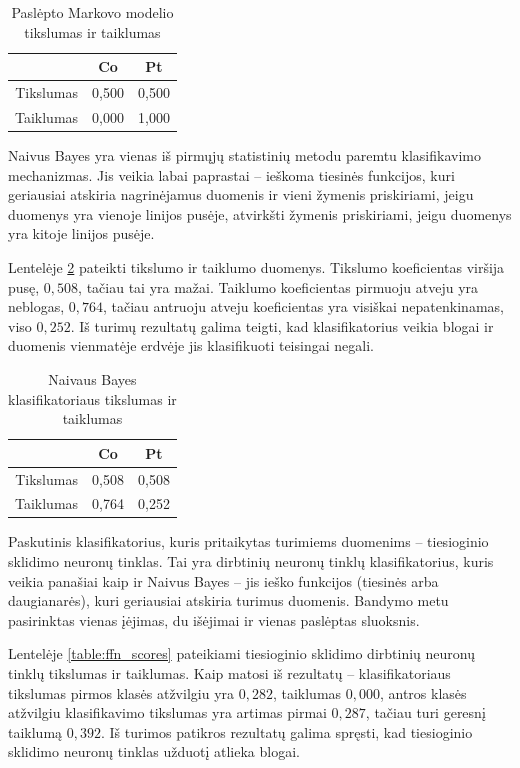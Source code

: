 \documentclass[]{vgtuef}
\begin{document}
\begin{table}
  \centering
  \renewcommand{\arraystretch}{1.3}
  \caption{Paslėpto Markovo modelio tikslumas ir taiklumas}
  \label{table:hmm_scores}
  \begin{tabular}{|c|c|c|} \hline
    & Co & Pt \\ \hline
    Tikslumas & 0,500 & 0,500 \\ \hline
    Taiklumas & 0,000 & 1,000 \\ \hline
  \end{tabular}
\end{table}

Naivus Bayes \cite{R22230} yra vienas iš pirmųjų statistinių metodu paremtu klasifikavimo mechanizmas. Jis veikia labai paprastai -- ieškoma tiesinės funkcijos, kuri geriausiai atskiria nagrinėjamus duomenis ir vieni žymenis priskiriami, jeigu duomenys yra vienoje linijos pusėje, atvirkšti žymenis priskiriami, jeigu duomenys yra kitoje linijos pusėje. 

Lentelėje \ref{table:nb_scores} pateikti tikslumo ir taiklumo duomenys. Tikslumo koeficientas viršija pusę, $0,508$, tačiau tai yra mažai. Taiklumo koeficientas pirmuoju atveju yra neblogas, $0,764$, tačiau antruoju atveju koeficientas yra visiškai nepatenkinamas, viso $0,252$. Iš turimų rezultatų galima teigti, kad klasifikatorius veikia blogai ir duomenis vienmatėje erdvėje jis klasifikuoti teisingai negali.

\begin{table}
  \centering
  \renewcommand{\arraystretch}{1.3}
  \caption{Naivaus Bayes klasifikatoriaus tikslumas ir taiklumas}
  \label{table:nb_scores}
  \begin{tabular}{|c|c|c|} \hline
    & Co & Pt \\ \hline
    Tikslumas & 0,508 & 0,508 \\ \hline
    Taiklumas & 0,764 & 0,252 \\ \hline
  \end{tabular}
\end{table}

Paskutinis klasifikatorius, kuris pritaikytas turimiems duomenims -- tiesioginio sklidimo neuronų tinklas. Tai yra dirbtinių neuronų tinklų klasifikatorius, kuris veikia panašiai kaip ir Naivus Bayes -- jis ieško funkcijos (tiesinės arba daugianarės), kuri geriausiai atskiria turimus duomenis. Bandymo metu pasirinktas vienas įėjimas, du išėjimai ir vienas paslėptas sluoksnis. 

Lentelėje \ref{table:ffn_scores} pateikiami tiesioginio sklidimo dirbtinių neuronų tinklų tikslumas ir taiklumas. Kaip matosi iš rezultatų -- klasifikatoriaus tikslumas pirmos klasės atžvilgiu yra $0,282$, taiklumas $0,000$, antros klasės atžvilgiu klasifikavimo tikslumas yra artimas pirmai $0,287$, tačiau turi geresnį taiklumą $0,392$. Iš turimos patikros rezultatų galima spręsti, kad tiesioginio sklidimo neuronų tinklas užduotį atlieka blogai.
\end{document}
